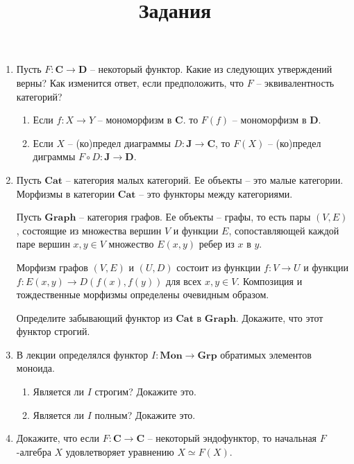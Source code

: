 \documentclass[draft]{article}
\newcommand{\cat}[1]{\mathbf{#1}}
\renewcommand{\C}{\cat{C}}
\newcommand{\D}{\cat{D}}
\newcommand{\Mon}{\cat{Mon}}
\newcommand{\Grp}{\cat{Grp}}
\begin{document}
\title{Задания}
\maketitle

\begin{enumerate}

\item Пусть $F : \C \to \D$ -- некоторый функтор.
Какие из следующих утверждений верны?
Как изменится ответ, если предположить, что $F$ -- эквивалентность категорий?
\begin{enumerate}
\item Если $f : X \to Y$ -- мономорфизм в $\C$. то $F(f)$ -- мономорфизм в $\D$.
\item Если $X$ -- (ко)предел диаграммы $D : \cat{J} \to \C$, то $F(X)$ -- (ко)предел диграммы $F \circ D : \cat{J} \to \D$.
\end{enumerate}

\item Пусть $\cat{Cat}$ -- категория малых категорий.
Ее объекты -- это малые категории.
Морфизмы в категории $\cat{Cat}$ -- это функторы между категориями.

Пусть $\cat{Graph}$ -- категория графов.
Ее объекты -- графы, то есть пары $(V,E)$, состоящие из множества вершин $V$ и функции $E$, сопоставляющей каждой паре вершин $x,y \in V$ множество $E(x,y)$ ребер из $x$ в $y$.

Морфизм графов $(V,E)$ и $(U,D)$ состоит из функции $f : V \to U$ и функции $f : E(x,y) \to D(f(x), f(y))$ для всех $x,y \in V$.
Композиция и тождественные морфизмы определены очевидным образом.

Определите забывающий функтор из $\cat{Cat}$ в $\cat{Graph}$.
Докажите, что этот функтор строгий.

\item В лекции определялся функтор $I : \Mon \to \Grp$ обратимых элементов моноида.
\begin{enumerate}
\item Является ли $I$ строгим? Докажите это.
\item Является ли $I$ полным? Докажите это.
\end{enumerate}

\item Докажите, что если $F : \C \to \C$ -- некоторый эндофунктор, то начальная $F$-алгебра $X$ удовлетворяет уравнению $X \simeq F(X)$.

\end{enumerate}
\end{document}
